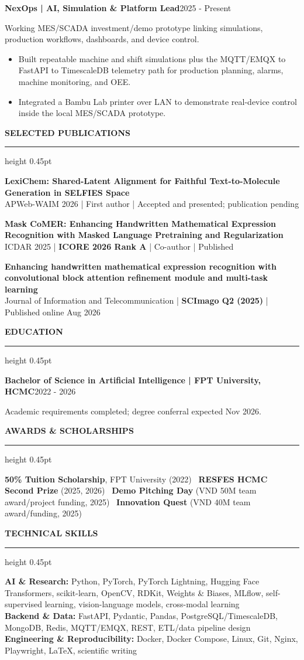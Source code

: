\documentclass[10pt]{article}
\newcommand{\cvsection}[1]{%
    \vspace{6.2pt}%
    {\color{accent}\bfseries\small #1}\par
    \vspace{2.3pt}%
    {\color{rulegray}\hrule height 0.45pt}\vspace{4.0pt}%
}
\newcommand{\entry}[2]{%
    \textbf{#1}\hfill {\color{muted}\small #2}\par
}
\newcommand{\subentry}[1]{%
    {\color{muted}\small #1}\par
}
\begin{document}
\entry{NexOps | AI, Simulation \& Platform Lead}{2025 - Present}
\subentry{Working MES/SCADA investment/demo prototype linking simulations, production workflows, dashboards, and device control.}
\begin{itemize}
    \item Built repeatable machine and shift simulations plus the MQTT/EMQX to FastAPI to TimescaleDB telemetry path for production planning, alarms, machine monitoring, and OEE.
    \item Integrated a Bambu Lab printer over LAN to demonstrate real-device control inside the local MES/SCADA prototype.
\end{itemize}

\cvsection{SELECTED PUBLICATIONS}
\textbf{LexiChem: Shared-Latent Alignment for Faithful Text-to-Molecule Generation in SELFIES Space}\\[-1pt]
{\small APWeb-WAIM 2026 | First author | Accepted and presented; publication pending}\par
\vspace{2.2pt}
\textbf{Mask CoMER: Enhancing Handwritten Mathematical Expression Recognition with Masked Language Pretraining and Regularization}\\[-1pt]
{\small ICDAR 2025 | \textbf{ICORE 2026 Rank A} | Co-author | Published}\par
\vspace{2.2pt}
\textbf{Enhancing handwritten mathematical expression recognition with convolutional block attention refinement module and multi-task learning}\\[-1pt]
{\small Journal of Information and Telecommunication | \textbf{SCImago Q2 (2025)} | Published online Aug 2026}

\cvsection{EDUCATION}
\entry{Bachelor of Science in Artificial Intelligence | FPT University, HCMC}{2022 - 2026}
{\small Academic requirements completed; degree conferral expected Nov 2026.}

\cvsection{AWARDS \& SCHOLARSHIPS}
{\small \textbf{50\% Tuition Scholarship}, FPT University (2022) \textbullet\
\textbf{RESFES HCMC Second Prize} (2025, 2026) \textbullet\
\textbf{Demo Pitching Day} (VND 50M team award/project funding, 2025) \textbullet\
\textbf{Innovation Quest} (VND 40M team award/funding, 2025)}

\cvsection{TECHNICAL SKILLS}
{\footnotesize
\textbf{AI \& Research:} Python, PyTorch, PyTorch Lightning, Hugging Face Transformers, scikit-learn, OpenCV, RDKit, Weights \& Biases, MLflow, self-supervised learning, vision-language models, cross-modal learning\\
\textbf{Backend \& Data:} FastAPI, Pydantic, Pandas, PostgreSQL/TimescaleDB, MongoDB, Redis, MQTT/EMQX, REST, ETL/data pipeline design\\
\textbf{Engineering \& Reproducibility:} Docker, Docker Compose, Linux, Git, Nginx, Playwright, LaTeX, scientific writing
}
\end{document}
